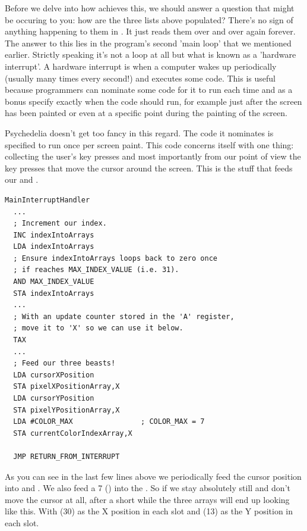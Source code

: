 Before we delve into how  achieves this, we should answer a question that might be occuring to you: how
are the three lists above populated? There's no sign of anything happening to them in . It just reads them over and
over again forever. The answer to this lies in the program's second 'main loop' that we mentioned earlier. 
Strictly speaking it's not a loop at all but what is known
as a 'hardware interrupt'. A hardware interrupt is when a computer wakes up periodically (usually many times every second!) and executes
some code. This is useful because programmers can nominate some code for it to run each time and as a bonus specify exactly when the code
should run, for example just after the screen has been painted or even at a specific point during the painting of the screen.  

Psychedelia doesn't get too fancy in this regard. The code it nominates is specified to run once per screen paint. This code concerns itself
with one thing: collecting the user's key presses and most importantly from our point of view the key presses that move the cursor around
the screen. This is the stuff that feeds our  and .

\begin{lstlisting}
MainInterruptHandler   
  ...
  ; Increment our index.
  INC indexIntoArrays
  LDA indexIntoArrays
  ; Ensure indexIntoArrays loops back to zero once
  ; if reaches MAX_INDEX_VALUE (i.e. 31).
  AND MAX_INDEX_VALUE
  STA indexIntoArrays
  ...
  ; With an update counter stored in the 'A' register,
  ; move it to 'X' so we can use it below.
  TAX
  ...
  ; Feed our three beasts!
  LDA cursorXPosition
  STA pixelXPositionArray,X
  LDA cursorYPosition
  STA pixelYPositionArray,X
  LDA #COLOR_MAX                ; COLOR_MAX = 7
  STA currentColorIndexArray,X

  JMP RETURN_FROM_INTERRUPT
\end{lstlisting}

As you can see in the last few lines above we periodically feed the cursor position into  and .
We also feed a 7 () into the . So if we stay absolutely still and don't move the cursor at all, after
a short while the three arrays will end up looking like this. With  (30) as the X position in each slot and  (13) as the Y
position in each slot.

